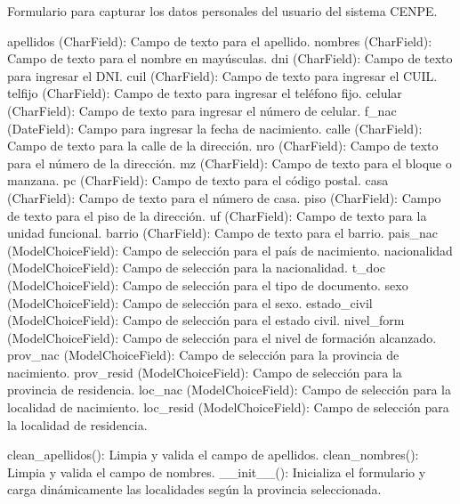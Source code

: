 \documentclass[letterpaper,10pt,spanish]{sphinxmanual}
\begin{document}
\begin{fulllineitems}

\pysigstartsignatures
{}
\pysigstopsignatures
\sphinxAtStartPar
Formulario para capturar los datos personales del usuario del sistema CENPE.
\begin{description}
\sphinxAtStartPar
apellidos (CharField): Campo de texto para el apellido.
nombres (CharField): Campo de texto para el nombre en mayúsculas.
dni (CharField): Campo de texto para ingresar el DNI.
cuil (CharField): Campo de texto para ingresar el CUIL.
telfijo (CharField): Campo de texto para ingresar el teléfono fijo.
celular (CharField): Campo de texto para ingresar el número de celular.
f\_nac (DateField): Campo para ingresar la fecha de nacimiento.
calle (CharField): Campo de texto para la calle de la dirección.
nro (CharField): Campo de texto para el número de la dirección.
mz (CharField): Campo de texto para el bloque o manzana.
pc (CharField): Campo de texto para el código postal.
casa (CharField): Campo de texto para el número de casa.
piso (CharField): Campo de texto para el piso de la dirección.
uf (CharField): Campo de texto para la unidad funcional.
barrio (CharField): Campo de texto para el barrio.
pais\_nac (ModelChoiceField): Campo de selección para el país de nacimiento.
nacionalidad (ModelChoiceField): Campo de selección para la nacionalidad.
t\_doc (ModelChoiceField): Campo de selección para el tipo de documento.
sexo (ModelChoiceField): Campo de selección para el sexo.
estado\_civil (ModelChoiceField): Campo de selección para el estado civil.
nivel\_form (ModelChoiceField): Campo de selección para el nivel de formación alcanzado.
prov\_nac (ModelChoiceField): Campo de selección para la provincia de nacimiento.
prov\_resid (ModelChoiceField): Campo de selección para la provincia de residencia.
loc\_nac (ModelChoiceField): Campo de selección para la localidad de nacimiento.
loc\_resid (ModelChoiceField): Campo de selección para la localidad de residencia.

\sphinxAtStartPar
clean\_apellidos(): Limpia y valida el campo de apellidos.
clean\_nombres(): Limpia y valida el campo de nombres.
\_\_init\_\_(): Inicializa el formulario y carga dinámicamente las localidades según la provincia seleccionada.


\end{description}
\end{fulllineitems}
\end{document}
